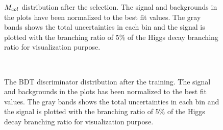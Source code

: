 \begin{figure}[htbp]
     \caption[$\mcol$ distribution after the selection in $\Hmuhad$ analysis]{$\mcol$ distribution after the selection. The signal and backgrounds in the plots have been normalized to the best fit values. The gray bands shows the total uncertainties in each bin and the signal is plotted with the branching ratio of 5\% of the Higgs decay branching ratio for visualization purpose.}
     \label{fig:cutbasedpostfit}
\end{figure}


\begin{figure}[htbp] 
     \centering
     \\
     \caption[The BDT discriminator distribution of $\Hmuhad$ anlaysis]{The BDT discriminator distribution after the training. The signal and backgrounds in the plots has been normalized to the best fit values. The gray bands shows the total uncertainties in each bin and the signal is plotted with the branching ratio of 5\% of the Higgs decay branching ratio for visualization purpose. }
     \label{fig:bdtbasedpostfit}
\end{figure}


